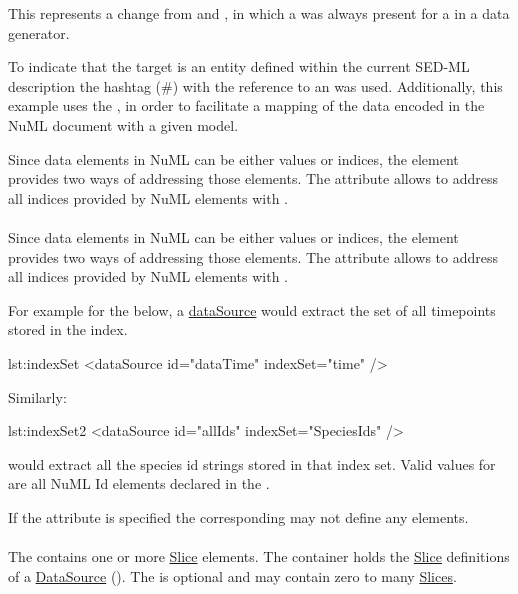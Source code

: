 This represents a change from \LoneVone and \LoneVtwo, in which a  was always present for a  in a data generator.

To indicate that the target is an entity defined within the current SED-ML description the hashtag (\#) with the reference to an  was used. Additionally, this example uses the , in order to facilitate a mapping of the data encoded in the NuML document with a given model. 

Since data elements in NuML can be either values or indices, the \SedDataSource element provides two ways of addressing those elements. The \hyperref[sec:indexSet]{} attribute allows to address all indices provided by NuML elements with . 


\paragraph*{}
\label{sec:indexSet}
Since data elements in NuML can be either values or indices, the \SedDataSource element provides two ways of addressing those elements. The  attribute allows to address all indices provided by NuML elements with . 

For example for the   below, a \hyperref[class:dataSource]{dataSource} would extract the set of all timepoints stored in the index.

\begin{myXmlLst}{}{lst:indexSet}
<dataSource id="dataTime" indexSet="time" />
\end{myXmlLst} 

Similarly: 

\begin{myXmlLst}{}{lst:indexSet2}
<dataSource id="allIds" indexSet="SpeciesIds" />
\end{myXmlLst} 

would extract all the species id strings stored in that index set. Valid values for  are all NuML Id elements declared in the . 

If the  attribute is specified the corresponding  may not define any  elements.


\paragraph*{}
\label{sec:listOfSlices}
The  contains one or more \hyperref[class:slice]{Slice} elements.
The  container holds the \hyperref[class:slice]{Slice} definitions of a \hyperref[class:dataSource]{DataSource} (). The  is optional and may contain zero to many \hyperref[class:slice]{Slices}.


